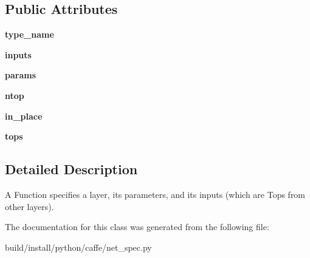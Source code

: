 \subsection*{Public Attributes}
\begin{DoxyCompactItemize}
\item 
\mbox{\label{classcaffe_1_1net__spec_1_1_function_a36a2ca301d8e8af50af4f1548ae03148}} 
{\bfseries type\+\_\+name}
\item 
\mbox{\label{classcaffe_1_1net__spec_1_1_function_a2c581efff5acb824cde54cb0f79c89d9}} 
{\bfseries inputs}
\item 
\mbox{\label{classcaffe_1_1net__spec_1_1_function_ad086630d531b800d3d74bdc176a7e1d0}} 
{\bfseries params}
\item 
\mbox{\label{classcaffe_1_1net__spec_1_1_function_a5fceb3c1ecca00e968ab51e75cad5ac4}} 
{\bfseries ntop}
\item 
\mbox{\label{classcaffe_1_1net__spec_1_1_function_a1dddc382f7d8b9c295da745f53f291b8}} 
{\bfseries in\+\_\+place}
\item 
\mbox{\label{classcaffe_1_1net__spec_1_1_function_a1324b1e729e07b232aef1c1f46a3cfdd}} 
{\bfseries tops}
\end{DoxyCompactItemize}


\subsection{Detailed Description}
\begin{DoxyVerb}A Function specifies a layer, its parameters, and its inputs (which
are Tops from other layers).\end{DoxyVerb}
 

The documentation for this class was generated from the following file\+:\begin{DoxyCompactItemize}
\item 
build/install/python/caffe/net\+\_\+spec.\+py\end{DoxyCompactItemize}

